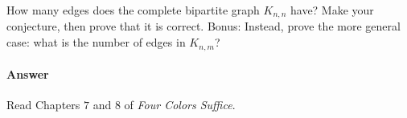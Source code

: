 \documentclass{article}
\begin{document}
\collab{\todo{}} 

How many edges does the complete bipartite graph $K_{n,n}$ have?  Make your
conjecture, then prove that it is correct.
Bonus: Instead, prove the more general case:
what is the number of edges in $K_{n,m}$?

\paragraph{Answer}





 

Read Chapters $7$ and $8$ of \emph{Four Colors Suffice}.
\end{document}
